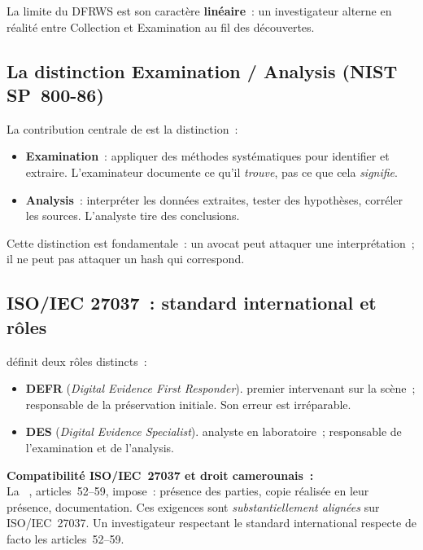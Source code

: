 La limite du DFRWS est son caractère \textbf{linéaire}~: un investigateur
alterne en réalité entre Collection et Examination au fil des découvertes.

\subsection{La distinction Examination / Analysis (NIST SP~800-86)}

La contribution centrale de  \cite{nist80086} est la
distinction~:
\begin{itemize}
    \item \textbf{Examination}~: appliquer des méthodes systématiques pour
          identifier et extraire. L'examinateur documente ce qu'il \emph{trouve},
          pas ce que cela \emph{signifie}.
    \item \textbf{Analysis}~: interpréter les données extraites, tester des
          hypothèses, corréler les sources. L'analyste tire des conclusions.
\end{itemize}

Cette distinction est fondamentale~: un avocat peut attaquer une interprétation~;
il ne peut pas attaquer un hash qui correspond.

\subsection{ISO/IEC 27037~: standard international et rôles}

 définit deux rôles distincts~:
\begin{itemize}
    \item \textbf{DEFR} (\textit{Digital Evidence First Responder}).
          premier intervenant sur la scène~; responsable de la préservation
          initiale. Son erreur est irréparable.
    \item \textbf{DES} (\textit{Digital Evidence Specialist}). analyste
          en laboratoire~; responsable de l'examination et de l'analysis.
\end{itemize}

\begin{boxjuris}
\textbf{Compatibilité ISO/IEC~27037 et droit camerounais~:}\\[0.3ex]
La ~\cite{cameroun2010a}, articles~52--59, impose~: présence des parties,
copie réalisée en leur présence, documentation. Ces exigences sont
\emph{substantiellement alignées} sur ISO/IEC~27037. Un investigateur
respectant le standard international respecte de facto les articles~52--59.
\end{boxjuris}

